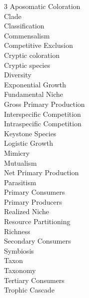
\begin{multicols}{3}
Aposomatic Coloration \\
Clade \\
Classification \\
Commensalism \\
Competitive Exclusion \\
Cryptic coloration \\
Cryptic species \\
Diversity \\
Exponential Growth \\
Fundamental Niche \\
Gross Primary Production \\
Interspecific Competition \\
Intraspecific Competition \\
Keystone Species \\
Logistic Growth \\
Mimicry \\
Mutualism \\
Net Primary Production \\
Parasitism \\
Primary Consumers \\
Primary Producers \\
Realized Niche \\
Resource Partitioning \\
Richness \\
Secondary Consumers \\
Symbiosis \\
Taxon \\
Taxonomy \\
Tertiary Consumers \\
Trophic Cascade 
\end{multicols}

